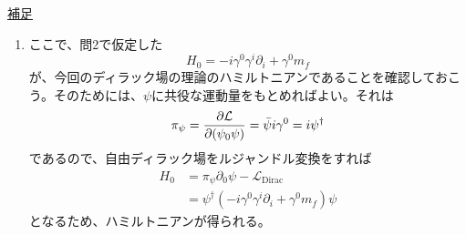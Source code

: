 \documentclass[unicode,a4paper,10pt]{ltjsarticle}
\begin{document}
\clearpage
\uline{補足}
\begin{enumerate}
  \item
        ここで、問2で仮定した
        \begin{equation}
          H_{0}
          =
          -i\gamma^{0}\gamma^{i}\partial_{i}+\gamma^{0}m_{f}
        \end{equation}
        が、今回のディラック場の理論のハミルトニアンであることを確認しておこう。そのためには、$\psi$に共役な運動量をもとめればよい。それは
        \begin{equation}
          \pi_{\psi}
          =
          \pdv{\mathcal{L}}{(\psi_{0}\psi)}
          =
          \bar{\psi}i\gamma^{0}
          =
          i\psi^{\dag}
        \end{equation}
        であるので、自由ディラック場をルジャンドル変換をすれば
        \begin{align}
          H_{0}
           & =
          \pi_{\psi}\partial_{0}\psi
          -
          \mathcal{L}_{\textrm{Dirac}}
          \nonumber
          \\
           & =
          \psi^{\dag}(-i\gamma^{0}\gamma^{i}\partial_{i}+\gamma^{0}m_{f})\psi
        \end{align}
        となるため、ハミルトニアンが得られる。

\end{enumerate}

% 
% 
\end{document}
